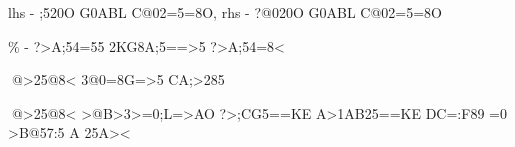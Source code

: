 \documentclass{article}
\begin{document}
\begin{maplegroup}
\begin{mapleinput}
\end{mapleinput}
\mapleresult
\begin{maplelatex}
\end{maplelatex}
\end{maplegroup}
\begin{maplegroup}
\begin{Maple Normal}{
lhs - ;520O G0ABL C@02=5=8O, rhs - ?@020O G0ABL C@02=5=8O

\% - ?>A;54=55 2KG8A;5==>5 ?>A;54=8<}\end{Maple Normal}

\begin{Maple Normal}{
}\end{Maple Normal}
\begin{Maple Normal}{
@>25@8< 3@0=8G=>5 CA;>285}\end{Maple Normal}
\end{maplegroup}
\begin{maplegroup}
\begin{mapleinput}
\end{mapleinput}
\mapleresult
\begin{maplelatex}
\end{maplelatex}
\mapleresult
\begin{maplelatex}
\end{maplelatex}
\end{maplegroup}
\begin{maplegroup}
\begin{Maple Normal}{
@>25@8< >@B>3>=0;L=>AO ?>;CG5==KE A>1AB25==KE DC=:F89 =0 >B@57:5
A 25A><
}\end{Maple Normal}

\end{maplegroup}
\end{document}
